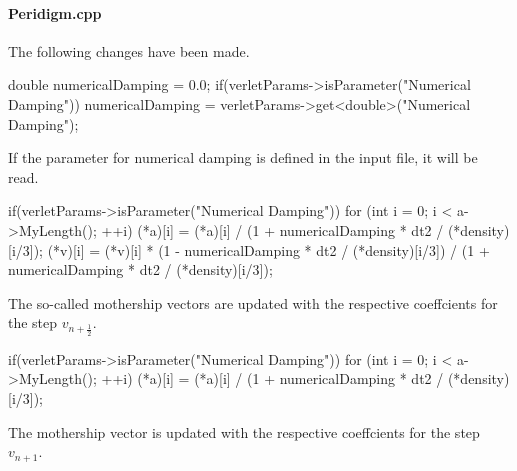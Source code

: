 \paragraph{Peridigm.cpp}
The following changes have been made.
\begin{code}
  double numericalDamping = 0.0;
  if(verletParams->isParameter("Numerical Damping")){
    numericalDamping = verletParams->get<double>("Numerical Damping");
  }
\end{code}
If the parameter for numerical damping is defined in the input file, it will be read.
\begin{code}
    if(verletParams->isParameter("Numerical Damping")){
    	for (int i = 0; i < a->MyLength(); ++i) {
    		(*a)[i] = (*a)[i] / (1 + numericalDamping * dt2 
    		/ (*density)[i/3]);
    		(*v)[i] = (*v)[i] * (1 - numericalDamping * dt2
    		/ (*density)[i/3]) / (1 + numericalDamping * dt2 
    		/ (*density)[i/3]);
    	}
    }
\end{code}
The so-called mothership vectors are updated with the respective coeffcients for the step $v_{n+{\frac{1}{2}}}$.
\begin{code}
    if(verletParams->isParameter("Numerical Damping")){
	for (int i = 0; i < a->MyLength(); ++i) {
		(*a)[i] = (*a)[i] / (1 + numericalDamping * dt2
		/ (*density)[i/3]);
	}
    }
\end{code}
The mothership vector is updated with the respective coeffcients for the step $v_{n+1}$.